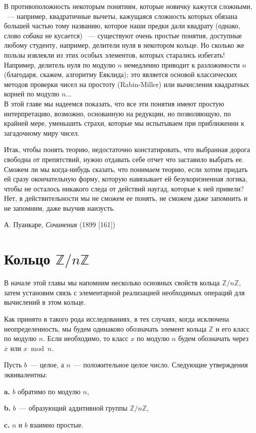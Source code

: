     \indent В противоположность некоторым понятиям, которые новичку кажутся сложными, ~— например, квадратичные вычеты, кажущаяся сложность которых обязана большей частью тому названию, которое наши предки дали квадрату (однако, слово \textit{собака} не кусается) ~— существуют очень простые понятия, доступные любому студенту, например, делители нуля в некотором кольце. Но сколько же пользы извлекли из этих особых элементов, которых старались избегать! Например, делитель нуля по модулю $n$ немедленно приводит к разложимости $n$ (благодаря, скажем, алгоритму Евклида); это является основой классических методов проверки чисел на простоту (Rabin-Miller) или вычисления квадратных корней по модулю $n\ldots$\\
    \indent В этой главе мы надеемся показать, что все эти понятия имеют простую интерпретацию, возможно, основанную на редукции, но
    позволяющую, по крайней мере, уменьшить страхи, которые мы испытываем при приближении к загадочному миру чисел.

    \epigraph {Итак, чтобы понять теорию, недостаточно констатировать, что выбранная дорога свободна от препятствий, нужно отдавать себе отчет что заставило выбрать ее. Сможем ли мы когда-нибудь сказать, что понимаем теорию, если хотим придать ей сразу окончательную форму, которую навязывает ей безукоризненная логика, чтобы не осталось никакого следа от действий наугад, которые к ней привели? Нет, в действительности мы не сможем ее понять, не сможем даже запомнить и не запомним, даже выучив наизусть.}{А. Пуанкаре, \textit{Сочинения} (1899 [161]) }

    \section{Кольцо $\mathbb{Z}/n\mathbb{Z}$}

    \noindent В начале этой главы мы напомним несколько основных свойств кольца $\mathbb{Z}/n\mathbb{Z}$, затем установим связь с элементарной реализацией необходимых операций для вычислений в этом кольце.

    Как принято в такого рода исследованиях, в тех случаях, когда исключена неопределенность, мы будем одинаково обозначать элемент
    кольца $\mathbb{Z}$ и его класс по модулю $n$. Если необходимо, то класс $x$ по модулю $n$ будем обозначать через $\overline{x}$ или $x \bmod n$.

    \begin{predl}
    \hspace*{0.5cm}
    Пусть $b$~— целое, а $n$~— положительное целое число. Следующие утверждения эквивалентны:

    {\bfseries a.\;} $b$ обратимо по модулю $n$,

    {\bfseries b.\;} $b$~— образующий аддитивной группы $\mathbb{Z}/n\mathbb{Z}$,

    {\bfseries c.\;} $n$ и $b$ взаимно простые.

    \end{predl}


